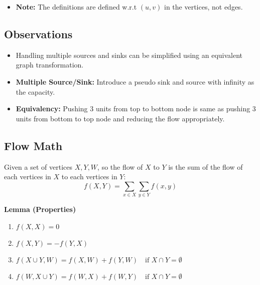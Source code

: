 \begin{warning}
    \begin{itemize}
        \item \textbf{Note:} The definitions are defined w.r.t $(u,v)$ in the vertices, not edges. 
    \end{itemize}
\end{warning}

\subsection{Observations}
\begin{definition}
    \begin{itemize}
        \item Handling multiple sources and sinks can be simplified using an equivalent graph transformation.
    \end{itemize}
    \begin{itemize}
        \item \textbf{Multiple Source/Sink:} Introduce a pseudo sink and source with infinity as the capacity.
        \item \textbf{Equivalency:} Pushing $3$ units from top to bottom node is same as pushing $3$ units from bottom to top node and reducing the flow appropriately.
    \end{itemize}
\end{definition}

\subsection{Flow Math}
\begin{definition}
    Given a set of vertices $X, Y,W$, so the flow of $X$ to $Y$ is the sum of the flow of each vertices in $X$ to each vertices in $Y$:
    \[
    f(X, Y) = \sum_{x \in X} \sum_{y \in Y} f(x, y)
    \]

    \textbf{Lemma (Properties)}
    \begin{enumerate}
        \item $f(X, X) = 0$
        \item $f(X, Y) = -f(Y, X)$
        \item $f(X \cup Y, W) = f(X, W) + f(Y, W) \quad \text{if } X \cap Y = \emptyset$
        \item $f(W, X \cup Y) = f(W, X) + f(W, Y) \quad \text{if } X \cap Y = \emptyset$ 
    \end{enumerate}
\end{definition}

